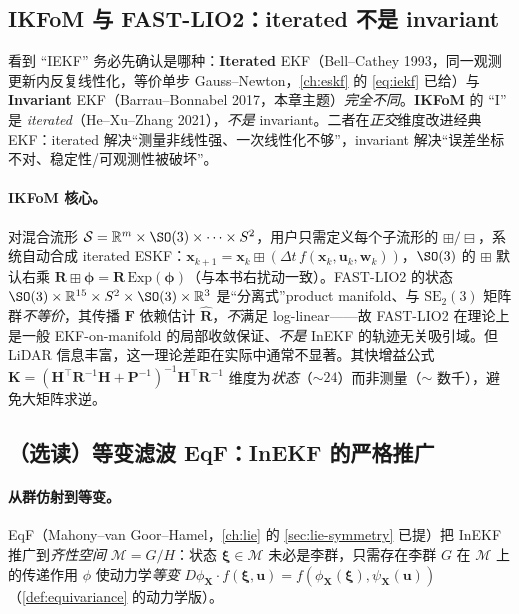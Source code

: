 \subsection{IKFoM 与 FAST-LIO2：iterated 不是 invariant}
\label{subsec:ikfom}

\begin{pitfall}
看到 “IEKF” 务必先确认是哪种：\textbf{Iterated} EKF（Bell--Cathey 1993，同一观测更新内反复线性化，等价单步 Gauss--Newton，\cref{ch:eskf} 的 \cref{eq:iekf} 已给）与 \textbf{Invariant} EKF（Barrau--Bonnabel 2017，本章主题）\emph{完全不同}。\textbf{IKFoM} 的 “I” 是 \emph{iterated}（He--Xu--Zhang 2021\cite{he2021ikfom}），\emph{不是} invariant。二者在\emph{正交}维度改进经典 EKF：iterated 解决“测量非线性强、一次线性化不够”，invariant 解决“误差坐标不对、稳定性/可观测性被破坏”。
\end{pitfall}

\paragraph{IKFoM 核心。}对混合流形 $\mathcal{S}=\mathbb{R}^m\times\SO(3)\times\cdots\times S^2$，用户只需定义每个子流形的 $\boxplus/\boxminus$，系统自动合成 iterated ESKF\cite{he2021ikfom}：$\mathbf{x}_{k+1}=\mathbf{x}_k\boxplus(\Delta t\,f(\mathbf{x}_k,\mathbf{u}_k,\mathbf{w}_k))$，$\SO(3)$ 的 $\boxplus$ 默认右乘 $\mathbf{R}\boxplus\boldsymbol{\phi}=\mathbf{R}\,\mathrm{Exp}(\boldsymbol{\phi})$（与本书右扰动一致）。FAST-LIO2\cite{xu2022fastlio2} 的状态 $\SO(3)\times\mathbb{R}^{15}\times S^2\times\SO(3)\times\mathbb{R}^3$ 是“分离式”product manifold、与 $\mathrm{SE}_2(3)$ 矩阵群\emph{不等价}，其传播 $\mathbf{F}$ 依赖估计 $\hat{\mathbf{R}}$，\emph{不}满足 log-linear——故 FAST-LIO2 在理论上是一般 EKF-on-manifold 的局部收敛保证、\emph{不是} InEKF 的轨迹无关吸引域。但 LiDAR 信息丰富，这一理论差距在实际中通常不显著。其快增益公式 $\mathbf{K}=(\mathbf{H}^\top\mathbf{R}^{-1}\mathbf{H}+\mathbf{P}^{-1})^{-1}\mathbf{H}^\top\mathbf{R}^{-1}$ 维度为\emph{状态}（$\sim24$）而非测量（$\sim$ 数千），避免大矩阵求逆。

\subsection{（选读）等变滤波 EqF：InEKF 的严格推广}
\label{subsec:eqf}

\paragraph{从群仿射到等变。}EqF（Mahony--van Goor--Hamel\cite{mahony2021equivariant}，\cref{ch:lie} 的 \cref{sec:lie-symmetry} 已提）把 InEKF 推广到\emph{齐性空间} $\mathcal{M}=G/H$：状态 $\boldsymbol{\xi}\in\mathcal{M}$ 未必是李群，只需存在李群 $G$ 在 $\mathcal{M}$ 上的传递作用 $\phi$ 使动力学\emph{等变} $D\phi_{\mathbf{X}}\cdot f(\boldsymbol{\xi},\mathbf{u})=f(\phi_{\mathbf{X}}(\boldsymbol{\xi}),\psi_{\mathbf{X}}(\mathbf{u}))$（\cref{def:equivariance} 的动力学版）。

